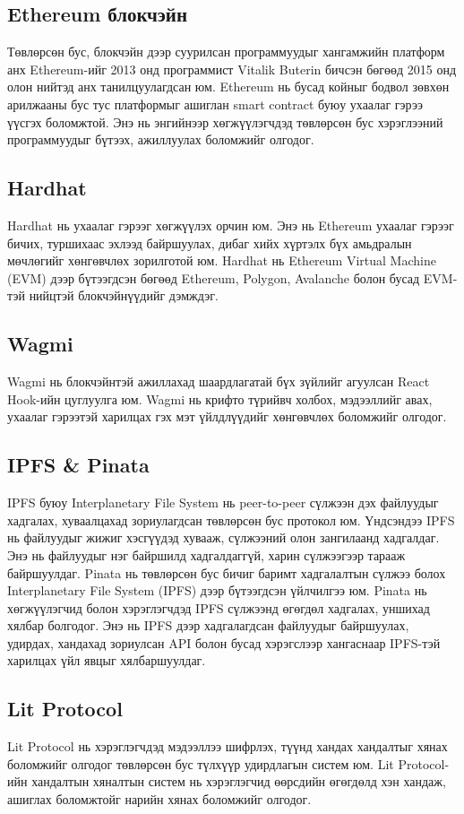 \subsection{Ethereum блокчэйн}
Төвлөрсөн бус, блокчэйн дээр суурилсан программуудыг хангамжийн платформ анх Ethereum-ийг 2013 онд программист Vitalik Buterin бичсэн бөгөөд 2015 онд олон нийтэд анх танилцуулагдсан юм. Ethereum нь бусад койныг бодвол зөвхөн арилжааны бус тус платформыг ашиглан smart contract буюу ухаалаг гэрээ үүсгэх боломжтой. Энэ нь энгийнээр хөгжүүлэгчдэд төвлөрсөн бус хэрэглээний программуудыг бүтээх, ажиллуулах боломжийг олгодог.

\subsection{Hardhat}
Hardhat нь ухаалаг гэрээг хөгжүүлэх орчин юм. Энэ нь Ethereum ухаалаг гэрээг бичих, туршихаас эхлээд байршуулах, дибаг хийх хүртэлх бүх амьдралын мөчлөгийг хөнгөвчлөх зорилготой юм. Hardhat нь Ethereum Virtual Machine (EVM) дээр бүтээгдсэн бөгөөд Ethereum, Polygon, Avalanche болон бусад EVM-тэй нийцтэй блокчэйнүүдийг дэмждэг.

\subsection{Wagmi}
Wagmi нь блокчэйнтэй ажиллахад шаардлагатай бүх зүйлийг агуулсан React Hook-ийн цуглуулга юм. Wagmi нь крифто түрийвч холбох, мэдээллийг авах, ухаалаг гэрээтэй харилцах гэх мэт үйлдлүүдийг хөнгөвчлөх боломжийг олгодог.

\subsection{IPFS \& Pinata}
IPFS буюу Interplanetary File System нь peer-to-peer сүлжээн дэх файлуудыг хадгалах, хуваалцахад зориулагдсан төвлөрсөн бус протокол юм. Үндсэндээ IPFS нь файлуудыг жижиг хэсгүүдэд хувааж, сүлжээний олон зангилаанд хадгалдаг. Энэ нь файлуудыг нэг байршилд хадгалдаггүй, харин сүлжээгээр тарааж байршуулдаг.
Pinata нь төвлөрсөн бус бичиг баримт хадгалалтын сүлжээ болох Interplanetary File System (IPFS) дээр бүтээгдсэн үйлчилгээ юм. Pinata нь хөгжүүлэгчид болон хэрэглэгчдэд IPFS сүлжээнд өгөгдөл хадгалах, уншихад хялбар болгодог. Энэ нь IPFS дээр хадгалагдсан файлуудыг байршуулах, удирдах, хандахад зориулсан API болон бусад хэрэгслээр хангаснаар IPFS-тэй харилцах үйл явцыг хялбаршуулдаг.

\subsection{Lit Protocol}
Lit Protocol нь хэрэглэгчдэд мэдээллээ шифрлэх, түүнд хандах хандалтыг хянах боломжийг олгодог төвлөрсөн бус түлхүүр удирдлагын систем юм. Lit Protocol-ийн хандалтын хяналтын систем нь хэрэглэгчид өөрсдийн өгөгдөлд хэн хандаж, ашиглах боломжтойг нарийн хянах боломжийг олгодог.

